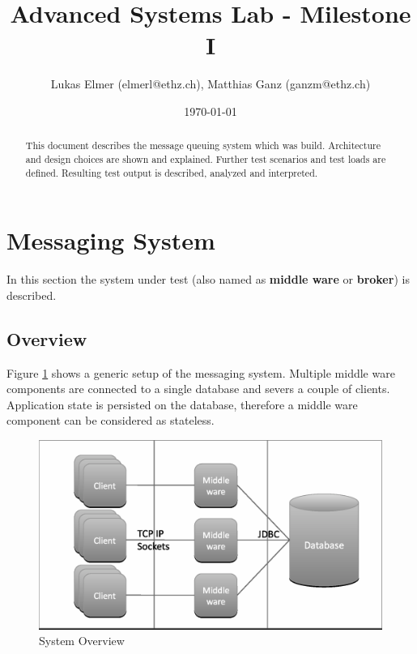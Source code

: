 \documentclass[a4paper]{article}
\title{Advanced Systems Lab - Milestone I}
\author{Lukas Elmer (elmerl@ethz.ch), Matthias Ganz (ganzm@ethz.ch)}
\date{\today}
\begin{document}
\maketitle

\pagebreak

\tableofcontents

\pagebreak

\begin{abstract}

This document describes the message queuing system which was build. Architecture and design choices are shown and explained. Further test scenarios and test loads are defined. Resulting test output is described, analyzed and interpreted.

\end{abstract}


\section{Messaging System}
In this section the system under test (also named as \textbf{middle ware}  or \textbf{broker}) is described.


\subsection{Overview}

Figure \ref{fig:system-overview} shows a generic setup of the messaging system. Multiple middle ware components are connected to a single database and severs a couple of clients. Application state is persisted on the database, therefore a middle ware component can be considered as stateless.


\begin{figure}[H]
  \begin{center}
    \includegraphics[scale=0.5]{../drawings/system-overview.eps}
  \end{center}
  \caption{System Overview}
  \label{fig:system-overview}
\end{figure}
\end{document}
